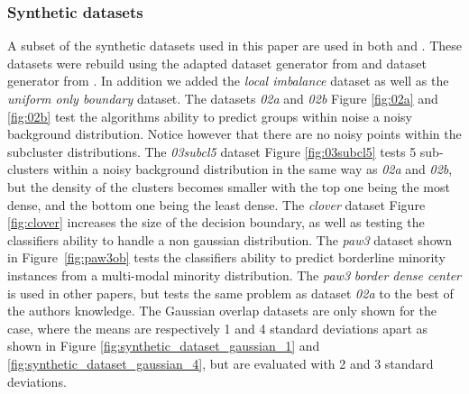 \subsubsection{Synthetic datasets}
A subset of the synthetic datasets used in this paper are used in both \cite{DBLP:conf/ida/MercierSASSS18} and \cite{santos2022joint}. These datasets were rebuild using the adapted dataset generator from \cite{santos2022joint} and dataset generator from \cite{DSPipe}. In addition we added the \emph{local imbalance} dataset as well as the \emph{uniform only boundary} dataset. The datasets \emph{02a} and \emph{02b} Figure \ref{fig:02a} and \ref{fig:02b} test the algorithms ability to predict groups within noise a noisy background distribution. Notice however that there are no noisy points within the subcluster distributions. The \emph{03subcl5} dataset Figure \ref{fig:03subcl5} tests 5 sub-clusters within a noisy background distribution in the same way as \emph{02a} and \emph{02b}, but the density of the clusters becomes smaller with the top one being the most dense, and the bottom one being the least dense. The \emph{clover} dataset Figure \ref{fig:clover} increases the size of the decision boundary, as well as testing the classifiers ability to handle a non gaussian distribution. The \emph{paw3} dataset shown in Figure~\ref{fig:paw3ob} tests the classifiers ability to predict borderline minority instances from a multi-modal minority distribution. The \emph{paw3} \emph{border dense center} is used in other papers, but tests the same problem as dataset \emph{02a} to the best of the authors knowledge.
The Gaussian overlap datasets are only shown for the case, where the means are respectively 1 and 4 standard deviations apart as shown in Figure \ref{fig:synthetic_dataset_gaussian_1} and \ref{fig:synthetic_dataset_gaussian_4}, but are evaluated with 2 and 3 standard deviations. 
